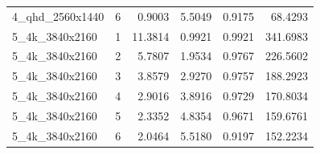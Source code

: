 \begin{table}
\begin{tabular}{lrrrrr}
4_qhd_2560x1440 & 6 & 0.9003 & 5.5049 & 0.9175 & 68.4293 \\
5_4k_3840x2160 & 1 & 11.3814 & 0.9921 & 0.9921 & 341.6983 \\
5_4k_3840x2160 & 2 & 5.7807 & 1.9534 & 0.9767 & 226.5602 \\
5_4k_3840x2160 & 3 & 3.8579 & 2.9270 & 0.9757 & 188.2923 \\
5_4k_3840x2160 & 4 & 2.9016 & 3.8916 & 0.9729 & 170.8034 \\
5_4k_3840x2160 & 5 & 2.3352 & 4.8354 & 0.9671 & 159.6761 \\
5_4k_3840x2160 & 6 & 2.0464 & 5.5180 & 0.9197 & 152.2234 \\
\bottomrule
\end{tabular}
\end{table}
